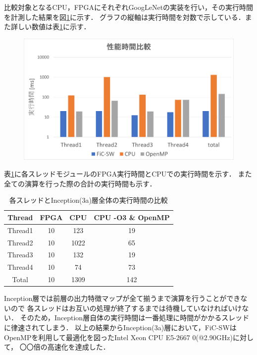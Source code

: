 {比較対象となるCPU，FPGAにそれぞれGoogLeNetの実装を行い，その実行時間を計測した結果を図\ref{fig:exec_graph}に示す．
グラフの縦軸は実行時間を対数で示している．また詳しい数値は表\ref{table:exec_time}に示す．

\begin{figure}[h]
    \centering
    \includegraphics[width=15cm]{./chap7/fig/exec_time.pdf}
    \caption{}
    \label{fig:exec_graph}
\end{figure}

表\ref{table:exec_time}に各スレッドモジュールのFPGA実行時間とCPUでの実行時間を示す．
また全ての演算を行った際の合計の実行時間も示す．

\begin{table}[p]
    \begin{center}
    \caption{各スレッドとInception(3a)層全体の実行時間の比較}
    \label{table:exec_time}
    \begin{tabular}{|c|c|c|c|} \hline
    \multicolumn{1}{|c|}{Thread} & \multicolumn{1}{|c|}{FPGA} & \multicolumn{1}{|c|}{CPU} & \multicolumn{1}{|c|}{CPU -O3 \& OpenMP} \\ \hline \hline
    Thread1       & 10 & 123 & 19 \\ \hline
    Thread2       & 10 & 1022 & 65 \\ \hline
    Thread3       & 10 & 132 & 19 \\ \hline
    Thread4       & 10 & 74 & 73 \\ \hline
    Total         & 10 & 1309 & 142 \\ \hline
    \end{tabular}
    \end{center}
\end{table}

Inception層では前層の出力特徴マップが全て揃うまで演算を行うことができないので
各スレッドはお互いの処理が終了するまでは待機していなければいけない．
そのため，Inception層自体の実行時間は一番処理に時間がかかるスレッドに律速されてしまう．
以上の結果からInception(3a)層において，FiC-SWはOpenMPを利用して最適化を図ったIntel Xeon CPU E5-2667 0(@2.90GHz)に対して，
〇〇倍の高速化を達成した．
}
